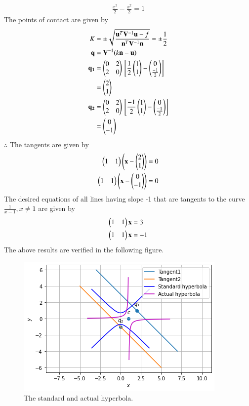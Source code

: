 \begin{align}
	\frac{x^2}{2} - \frac{x^2}{2} = 1
\end{align}
The points of contact are given by 
\begin{align}
  \tiny{K} &=\pm \sqrt{\frac{\mathbf{u}^T\mathbf{V}^{-1}\mathbf{u} - f}{\mathbf{n}^T\mathbf{V}^{-1}\mathbf{n}}}
  = \pm \frac{1}{2}\\
  \mathbf{q} &= \mathbf{V}^{-1}(k\mathbf{n}-\mathbf{u})\\
  \mathbf{q_1} &= \begin{pmatrix}0 & 2\\2 & 0\end{pmatrix} {}\left[\frac{1}{2}\begin{pmatrix}1 \\ 1\end{pmatrix} - \begin{pmatrix}0\\ \frac{-1}{2}\end{pmatrix}\right]\\
  &= \begin{pmatrix}2 \\ 1\end{pmatrix}\\
  \mathbf{q_2} &= \begin{pmatrix}0 & 2\\2 & 0\end{pmatrix} {}\left[\frac{-1}{2}\begin{pmatrix}1 \\ 1\end{pmatrix} - \begin{pmatrix}0\\ \frac{-1}{2}\end{pmatrix}\right]\\
  &= \begin{pmatrix}0 \\ -1\end{pmatrix}
\end{align} 
$\therefore$ The tangents are given by
\begin{align}
	\begin{pmatrix}1 & 1\end{pmatrix} \left(\mathbf{x} - \begin{pmatrix}2 \\ 1\end{pmatrix}\right) = 0 \\
	\begin{pmatrix}1 & 1\end{pmatrix} \left(\mathbf{x} - \begin{pmatrix}0 \\ -1\end{pmatrix}\right) = 0
\end{align}
The desired equations of all lines having slope -1 that are tangents to the curve $\frac{1}{x-1}, x \neq 1$ are given by
\begin{align}
	\begin{pmatrix}1 & 1\end{pmatrix}\mathbf{x} &= 3 \\
	\begin{pmatrix}1 & 1\end{pmatrix}\mathbf{x} &= -1 
\end{align}
The above results are verified in the following figure.
\begin{figure}[h!] \label{eq:solutions/1/14/fig:tangents}
	\centering
	\includegraphics[width=\columnwidth]{./solutions/conics/1/14/graph7.png}
	\caption{The standard and actual hyperbola.}
\end{figure}
